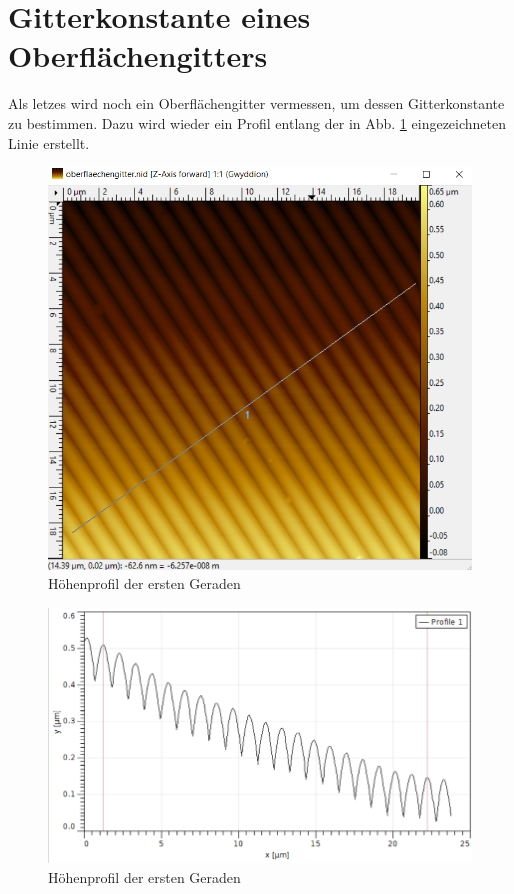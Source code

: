 

\section{Gitterkonstante eines Oberflächengitters}

Als letzes wird noch ein Oberflächengitter vermessen, um dessen Gitterkonstante zu bestimmen. Dazu wird wieder ein Profil entlang der in 
Abb. \ref{bild:OFGitter} eingezeichneten Linie erstellt.

\begin{figure}[h]
    \centering
    \includegraphics[scale = 0.5]{Bilder/OFGitter.png}
    \caption{Höhenprofil der ersten Geraden}
    \label{bild:OFGitter}
\end{figure}

\begin{figure}[h]
    \centering
    \includegraphics[scale = 0.5]{Bilder/OFGitterProfil.png}
    \caption{Höhenprofil der ersten Geraden}
    \label{bild:OFGitterProfil}
\end{figure}

